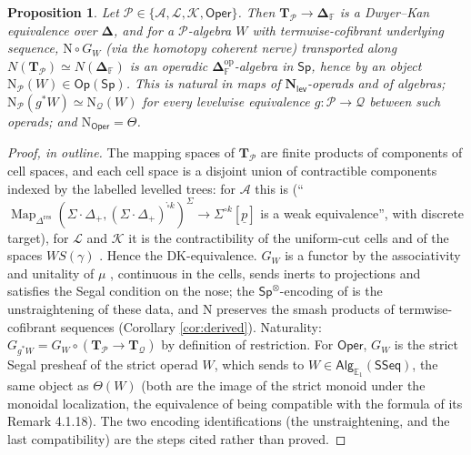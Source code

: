 \documentclass[11pt]{amsart}
\newtheorem{proposition}[subsection]{Proposition}
\theoremstyle{definition}
\theoremstyle{remark}
\newcommand{\Sp}{\mathsf{Sp}}
\newcommand{\Map}{\operatorname{Map}}
\newcommand{\SSeq}{\mathsf{SSeq}}
\newcommand{\Oper}{\mathsf{Oper}}
\newcommand{\Op}{\mathsf{Op}}
\newcommand{\Alg}{\mathsf{Alg}}
\newcommand{\Nl}{\mathbf{N}_{\mathsf{lev}}}
\newcommand{\Kop}{\mathcal{K}}
\newcommand{\Lop}{\mathcal{L}}
\newcommand{\Aop}{\mathcal{A}}
\newcommand{\Fin}{\mathbb{F}}
\newcommand{\TT}{\mathbf{T}}
\newcommand{\DFF}{\mathbf{\Delta}_{\Fin}}
\newcommand{\Nfun}{\mathrm{N}}
\newcommand{\Th}{\Theta}
\begin{document}
\begin{proposition}\label{prop:F4S}
Let $\mathcal P\in\{\Aop,\Lop,\Kop,\Oper\}$. Then $\TT_{\mathcal P}\to\DFF$ is a Dwyer--Kan equivalence over $\mathbf\Delta$, and for a $\mathcal P$-algebra $W$ with termwise-cofibrant underlying sequence, $\Nfun\circ G_W$ (via the homotopy coherent nerve) transported along $N(\TT_{\mathcal P})\simeq N(\DFF)$ is an operadic $\DFF^{\mathrm{op}}$-algebra in $\Sp$, hence by \cite[Corollary 4.2.9(iii)]{Hau} an object $\Nfun_{\mathcal P}(W)\in\Op(\Sp)$. This is natural in maps of $\Nl$-operads and of algebras; $\Nfun_{\mathcal P}(g^*W)\simeq\Nfun_{\mathcal Q}(W)$ for every levelwise equivalence $g\colon\mathcal P\to\mathcal Q$ between such operads; and $\Nfun_{\Oper}=\Th$.
\end{proposition}
\begin{proof}[Proof, in outline]
The mapping spaces of $\TT_{\mathcal P}$ are finite products of components of cell spaces, and each cell space is a disjoint union of contractible components indexed by the labelled levelled trees: for $\Aop$ this is \cite[Proposition 7.16]{Cl1} (``$\Map_{\Delta^{\mathrm{res}}}(\Sigma\cdot\Delta_+,(\Sigma\cdot\Delta_+)^{\mathring\square k})^\Sigma\to\Sigma^{\circ k}[\underline p]$ is a weak equivalence'', with discrete target), for $\Lop$ and $\Kop$ it is the contractibility of the uniform-cut cells and of the spaces $WS(\gamma)$ \cite[Definition A.56, Theorem A.60, \S A.61]{Cl2}. Hence the DK-equivalence. $G_W$ is a functor by the associativity and unitality of $\mu$ \cite[Definition 6.25]{Cl1}, continuous in the cells, sends inerts to projections and satisfies the Segal condition on the nose; the $\Sp^\otimes$-encoding of \cite[Definition 2.4.3]{CH20} is the unstraightening of these data, and $\Nfun$ preserves the smash products of termwise-cofibrant sequences (Corollary \ref{cor:derived}). Naturality: $G_{g^*W}=G_W\circ(\TT_{\mathcal P}\to\TT_{\mathcal Q})$ by definition of restriction. For $\Oper$, $G_W$ is the strict Segal presheaf of the strict operad $W$, which \cite[Corollary 4.2.9(iii)]{Hau} sends to $W\in\Alg_{\mathbb{E}_1}(\SSeq)$, the same object as $\Th(W)$ (both are the image of the strict monoid under the monoidal localization, the equivalence of \cite[Corollary 4.2.9]{Hau} being compatible with the formula of its Remark 4.1.18). The two encoding identifications (the unstraightening, and the last compatibility) are the steps cited rather than proved.
\end{proof}
\end{document}
